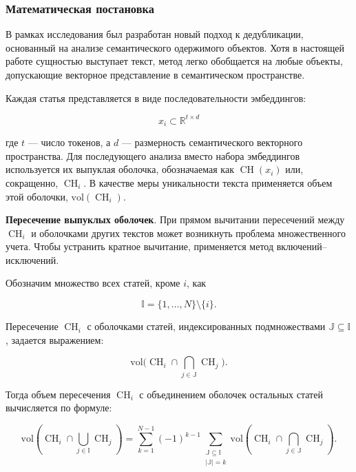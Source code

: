 \subsubsection{Математическая постановка}
\label{sec:semantic_deduplication}
\sloppy  %

В рамках исследования был разработан новый подход к дедубликации, основанный на анализе семантического
одержимого объектов. Хотя в настоящей работе сущностью выступает текст, метод легко обобщается на любые
объекты, допускающие векторное представление в семантическом пространстве.

Каждая статья представляется в виде последовательности эмбеддингов:

\begin{equation}
    x_i \subset \mathbb{R}^{t\times d}
\end{equation}

где $t$ --- число токенов, а $d$ --- размерность семантического векторного пространства.
Для последующего анализа вместо набора эмбеддингов используется их выпуклая оболочка,
обозначаемая как $\operatorname{CH}(x_i)$ или, сокращенно, $\operatorname{CH}_i$. В качестве
меры уникальности текста применяется объем этой оболочки, $\mathrm{vol}(\operatorname{CH}_i)$.

\textbf{Пересечение выпуклых оболочек}. При прямом вычитании пересечений между
$\operatorname{CH}_i$ и оболочками других текстов может возникнуть проблема
множественного учета. Чтобы устранить кратное вычитание, применяется метод
включений–исключений.

Обозначим множество всех статей, кроме $i$, как

\begin{equation}
    \mathbb{I} = \{1, \ldots, N\} \setminus \{i\}.
\end{equation}

Пересечение $\operatorname{CH}_i$ с оболочками статей, индексированных подмножествами $\mathbb{J} \subseteq \mathbb{I}$, задается выражением:

\begin{equation}
    \mathrm{vol}\Big(\operatorname{CH}_i \cap \bigcap_{j \in \mathbb{J}}\operatorname{CH}_j\Big).
\end{equation}

Тогда объем пересечения $\operatorname{CH}_i$ с объединением оболочек остальных статей вычисляется по формуле:

\begin{equation}\label{eq:inclusion-exclusion_substituting}
    \mathrm{vol}\left(\operatorname{CH}_i \cap \bigcup_{j \in \mathbb{I}}\operatorname{CH}_j\right)
    =
    \sum_{k=1}^{N-1} (-1)^{k-1} \sum_{\substack{\mathbb{J} \subseteq \mathbb{I} \\ |\mathbb{J}| = k}}
    \mathrm{vol}\left(\operatorname{CH}_i \cap \bigcap_{j \in \mathbb{J}}\operatorname{CH}_j\right).
\end{equation}

